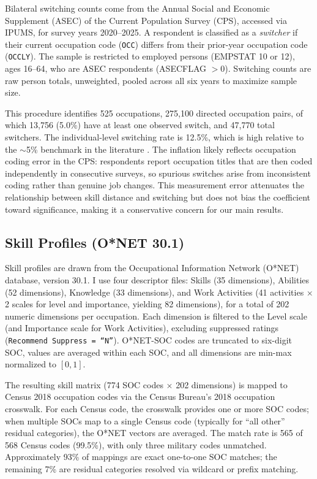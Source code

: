 \documentclass[12pt]{article}
\begin{document}
Bilateral switching counts come from the Annual Social and Economic Supplement (ASEC) of the Current Population Survey (CPS), accessed via IPUMS, for survey years 2020--2025. A respondent is classified as a \emph{switcher} if their current occupation code (\texttt{OCC}) differs from their prior-year occupation code (\texttt{OCCLY}). The sample is restricted to employed persons (EMPSTAT 10 or 12), ages 16--64, who are ASEC respondents (ASECFLAG $> 0$). Switching counts are raw person totals, unweighted, pooled across all six years to maximize sample size.

This procedure identifies 525 occupations, 275,100 directed occupation pairs, of which 13,756 (5.0\%) have at least one observed switch, and 47,770 total switchers. The individual-level switching rate is 12.5\%, which is high relative to the $\sim$5\% benchmark in the literature \citep{kambourov2008}. The inflation likely reflects occupation coding error in the CPS: respondents report occupation titles that are then coded independently in consecutive surveys, so spurious switches arise from inconsistent coding rather than genuine job changes. This measurement error attenuates the relationship between skill distance and switching but does not bias the coefficient toward significance, making it a conservative concern for our main results.

\subsection{Skill Profiles (O*NET 30.1)}
\label{sec:data_onet}

Skill profiles are drawn from the Occupational Information Network (O*NET) database, version 30.1. I use four descriptor files: Skills (35 dimensions), Abilities (52 dimensions), Knowledge (33 dimensions), and Work Activities (41 activities $\times$ 2 scales for level and importance, yielding 82 dimensions), for a total of 202 numeric dimensions per occupation. Each dimension is filtered to the Level scale (and Importance scale for Work Activities), excluding suppressed ratings (\texttt{Recommend Suppress = ``N''}). O*NET-SOC codes are truncated to six-digit SOC, values are averaged within each SOC, and all dimensions are min-max normalized to $[0,1]$.

The resulting skill matrix (774 SOC codes $\times$ 202 dimensions) is mapped to Census 2018 occupation codes via the Census Bureau's 2018 occupation crosswalk. For each Census code, the crosswalk provides one or more SOC codes; when multiple SOCs map to a single Census code (typically for ``all other'' residual categories), the O*NET vectors are averaged. The match rate is 565 of 568 Census codes (99.5\%), with only three military codes unmatched. Approximately 93\% of mappings are exact one-to-one SOC matches; the remaining 7\% are residual categories resolved via wildcard or prefix matching.
\end{document}
